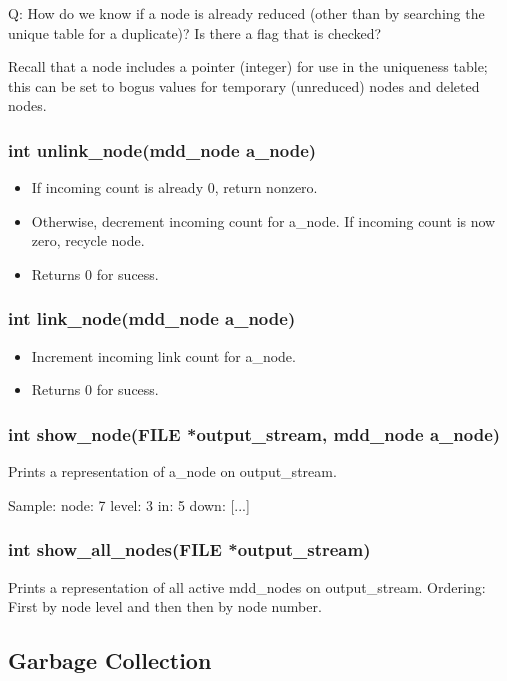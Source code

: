 \documentclass[12pt]{article}
\newcommand{\TBD}[1]{{\color{blue}{\bf TBD:} #1}}
\begin{document}
\TBD{
Q: How do we know if a node is already reduced (other than by searching the
unique table for a duplicate)? Is there a flag that is checked?

Recall that a node includes a pointer (integer) for use in the uniqueness
table; this can be set to bogus values for temporary (unreduced) nodes and
deleted nodes.
}

\subsubsection{int unlink\_node(mdd\_node a\_node)}

\begin{itemize}
\item
If incoming count is already 0, return nonzero.
\item
Otherwise, decrement incoming count for a\_node. If incoming count is now
zero, recycle node.
\item
Returns 0 for sucess.
\end{itemize}

\subsubsection{int link\_node(mdd\_node a\_node)}

\begin{itemize}
\item
Increment incoming link count for a\_node.
\item
Returns 0 for sucess.
\end{itemize}

\subsubsection{int show\_node(FILE *output\_stream, mdd\_node a\_node)}

Prints a representation of a\_node on output\_stream.

\noindent
Sample: node: 7  level: 3  in: 5   down: [...]

\subsubsection{int show\_all\_nodes(FILE *output\_stream)}

Prints a representation of all active mdd\_nodes on output\_stream. Ordering: First by node level and then then by node number.

\subsection{Garbage Collection}
\end{document}
